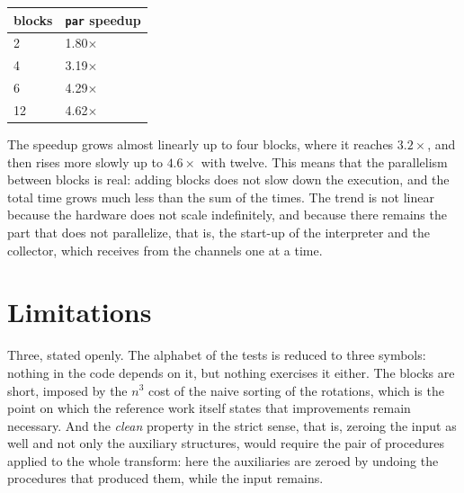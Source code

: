 \begin{center}
\begin{minipage}[c]{0.30\textwidth}
\centering
\begin{tabular}{ll}
\hline
blocks & \texttt{par} speedup\\
\hline
2 & 1.80$\times$\\
4 & 3.19$\times$\\
6 & 4.29$\times$\\
12 & 4.62$\times$\\
\hline
\end{tabular}
\end{minipage}
\hfill
\begin{minipage}[c]{0.65\textwidth}
\centering
{}
\end{minipage}
\end{center}

\noindent
The speedup grows almost linearly up to four blocks, where it reaches $3.2\times$, and then rises more
slowly up to $4.6\times$ with twelve. This means that the parallelism between
blocks is real: adding blocks does not slow down the execution, and the total
time grows much less than the sum of the times. The trend is not linear because the hardware does not scale indefinitely, and because
there remains the part that does not parallelize, that is, the start-up of the interpreter and the
collector, which receives from the channels one at a time.

\section{Limitations}

Three, stated openly. The alphabet of the tests is reduced to three symbols: nothing in the
code depends on it, but nothing exercises it either. The blocks are short, imposed by the
$n^3$ cost of the naive sorting of the rotations, which is the point on which the
reference work itself states that improvements remain necessary. And
the \emph{clean} property in the strict sense, that is,
zeroing the input as well and not only the auxiliary structures, would require the
pair of procedures applied to the whole transform: here the auxiliaries are
zeroed by undoing the procedures that produced them, while the input remains.

